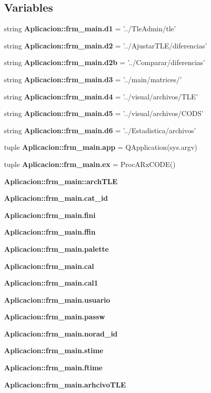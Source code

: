 \subsection*{\-Variables}
\begin{DoxyCompactItemize}
\item 
string {\bf \-Aplicacion\-::frm\-\_\-main.\-d1} = '../\-Tle\-Admin/tle'
\item 
string {\bf \-Aplicacion\-::frm\-\_\-main.\-d2} = '../\-Ajustar\-T\-L\-E/diferencias'
\item 
string {\bf \-Aplicacion\-::frm\-\_\-main.\-d2b} = '../\-Comparar/diferencias'
\item 
string {\bf \-Aplicacion\-::frm\-\_\-main.\-d3} = '../main/matrices/'
\item 
string {\bf \-Aplicacion\-::frm\-\_\-main.\-d4} = '../visual/archivos/\-T\-L\-E'
\item 
string {\bf \-Aplicacion\-::frm\-\_\-main.\-d5} = '../visual/archivos/\-C\-O\-D\-S'
\item 
string {\bf \-Aplicacion\-::frm\-\_\-main.\-d6} = '../\-Estadistica/archivos'
\item 
tuple {\bf \-Aplicacion\-::frm\-\_\-main.\-app} = \-Q\-Application(sys.\-argv)
\item 
tuple {\bf \-Aplicacion\-::frm\-\_\-main.\-ex} = \-Proc\-A\-Rx\-C\-O\-D\-E()
\item 
{\bf \-Aplicacion\-::frm\-\_\-main\-::arch\-T\-L\-E}
\item 
{\bf \-Aplicacion\-::frm\-\_\-main.\-cat\-\_\-id}
\item 
{\bf \-Aplicacion\-::frm\-\_\-main.\-fini}
\item 
{\bf \-Aplicacion\-::frm\-\_\-main.\-ffin}
\item 
{\bf \-Aplicacion\-::frm\-\_\-main.\-palette}
\item 
{\bf \-Aplicacion\-::frm\-\_\-main.\-cal}
\item 
{\bf \-Aplicacion\-::frm\-\_\-main.\-cal1}
\item 
{\bf \-Aplicacion\-::frm\-\_\-main.\-usuario}
\item 
{\bf \-Aplicacion\-::frm\-\_\-main.\-passw}
\item 
{\bf \-Aplicacion\-::frm\-\_\-main.\-norad\-\_\-id}
\item 
{\bf \-Aplicacion\-::frm\-\_\-main.\-stime}
\item 
{\bf \-Aplicacion\-::frm\-\_\-main.\-ftime}
\item 
{\bf \-Aplicacion\-::frm\-\_\-main.\-arhcivo\-T\-L\-E}
\item 

\end{DoxyCompactItemize}
